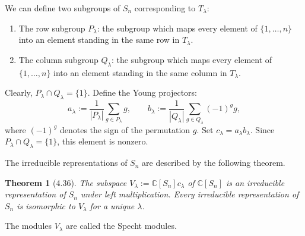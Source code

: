 \documentclass[UTF8,11pt]{ctexart}
\newtheorem*{theorem}{Theorem}
\theoremstyle{definition}
\newcommand{\C}{\mathbb C}
\begin{document}
We can define two subgroups of $S_n$ corresponding to $T_\lambda$:
\begin{enumerate}
\item The row subgroup $P_\lambda$: the subgroup which maps every element of $\{1,\ldots,n\}$ into an element standing in the same row in $T_\lambda$.
\item The column subgroup $Q_\lambda$: the subgroup which maps every element of $\{1,\ldots,n\}$ into an element standing in the same column in $T_\lambda$.
\end{enumerate}
Clearly, $P_\lambda\cap Q_\lambda=\{1\}$. Define the Young projectors:
\[
a_\lambda:=\frac1{|P_\lambda|}\sum_{g\in P_\lambda}g,\qquad
b_\lambda:=\frac1{|Q_\lambda|}\sum_{g\in Q_\lambda}(-1)^g g,
\]
where $(-1)^g$ denotes the sign of the permutation $g$. Set $c_\lambda=a_\lambda b_\lambda$. Since $P_\lambda\cap Q_\lambda=\{1\}$, this element is nonzero.

The irreducible representations of $S_n$ are described by the following theorem.
\begin{theorem}[4.36]
The subspace $V_\lambda:=\C[S_n]c_\lambda$ of $\C[S_n]$ is an irreducible representation of $S_n$ under left multiplication. Every irreducible representation of $S_n$ is isomorphic to $V_\lambda$ for a unique $\lambda$.
\end{theorem}
The modules $V_\lambda$ are called the Specht modules.
\end{document}
